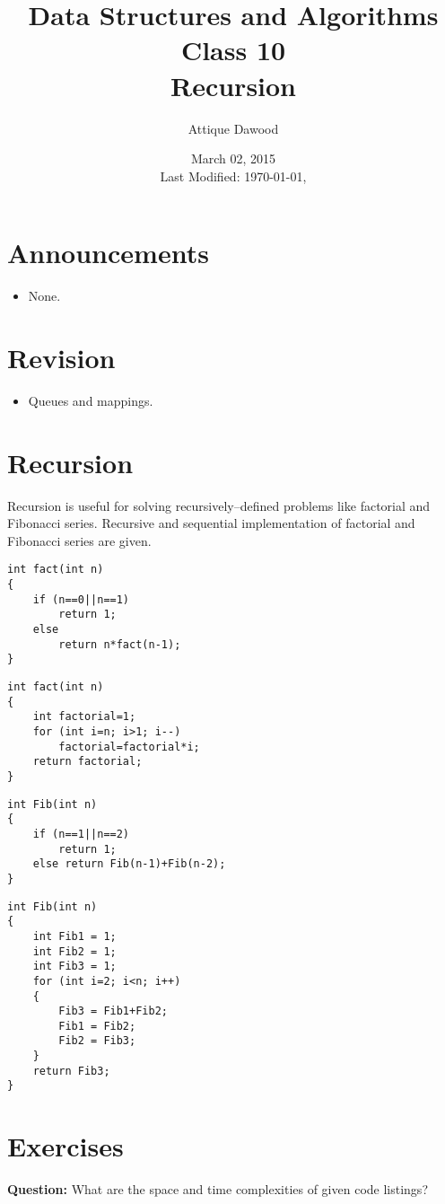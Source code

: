 \documentclass[12pt,a4paper]{article}
\title{Data Structures and Algorithms\\Class 10\\Recursion}
\author{Attique Dawood}
\date{March 02, 2015\\[0.2cm] Last Modified: \today, \currenttime}
\begin{document}
\maketitle
\section{Announcements}
\begin{itemize}
\item None.
\end{itemize}
\section{Revision}
\begin{itemize}
\item Queues and mappings.
\end{itemize}
\section{Recursion}
Recursion is useful for solving recursively--defined problems like factorial and Fibonacci series. Recursive and sequential implementation of factorial and Fibonacci series are given.
\begin{lstlisting}[caption={Recursive Factorial}]
int fact(int n)
{
    if (n==0||n==1)
        return 1;
    else
        return n*fact(n-1);
}
\end{lstlisting}
\begin{lstlisting}[caption={Loop Based Factorial}]
int fact(int n)
{
	int factorial=1;
	for (int i=n; i>1; i--)
		factorial=factorial*i;
	return factorial;
}
\end{lstlisting}
\begin{lstlisting}[caption={Recursive Fibonacci Series}]
int Fib(int n)
{
	if (n==1||n==2)
		return 1;
	else return Fib(n-1)+Fib(n-2);
}
\end{lstlisting}
\begin{lstlisting}[caption={Loop Based Fibonacci Series}]
int Fib(int n)
{
	int Fib1 = 1;
	int Fib2 = 1;
	int Fib3 = 1;
	for (int i=2; i<n; i++)
	{
		Fib3 = Fib1+Fib2;
		Fib1 = Fib2;
		Fib2 = Fib3;
	}
	return Fib3;
}
\end{lstlisting}
\section{Exercises}
\noindent\textbf{Question:} What are the space and time complexities of given code listings?\\[0.2cm]
\nocite{*}


\end{document}
